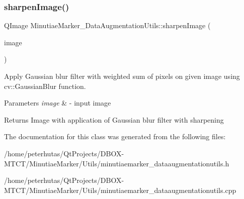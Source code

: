 \subsubsection{\texorpdfstring{sharpen\+Image()}{sharpenImage()}}
{\footnotesize\ttfamily Q\+Image Minutiae\+Marker\+\_\+\+Data\+Augmentation\+Utils\+::sharpen\+Image (\begin{DoxyParamCaption}\item[{Q\+Image}]{image }\end{DoxyParamCaption})\hspace{0.3cm}{\ttfamily [static]}}



Apply Gaussian blur filter with weighted sum of pixels on given image using cv\+::\+Gaussian\+Blur function. 


\begin{DoxyParams}{Parameters}
{\em image} & -\/ input image \\
\hline
\end{DoxyParams}
\begin{DoxyReturn}{Returns}
Image with application of Gaussian blur filter with sharpening 
\end{DoxyReturn}


The documentation for this class was generated from the following files\+:\begin{DoxyCompactItemize}
\item 
/home/peterhutas/\+Qt\+Projects/\+D\+B\+O\+X-\/\+M\+T\+C\+T/\+Minutiae\+Marker/\+Utils/minutiaemarker\+\_\+dataaugmentationutils.\+h\item 
/home/peterhutas/\+Qt\+Projects/\+D\+B\+O\+X-\/\+M\+T\+C\+T/\+Minutiae\+Marker/\+Utils/minutiaemarker\+\_\+dataaugmentationutils.\+cpp\end{DoxyCompactItemize}
